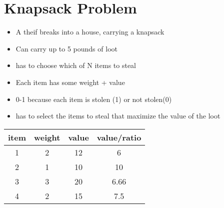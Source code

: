 \documentclass{article}
\begin{document}
\section*{Knapsack Problem}
\begin{itemize}
    \item A theif breaks into a house, carrying a knapsack
    \item Can carry up to 5 pounds of loot
    \item has to choose which of N items to steal
    \item Each item has some weight + value
    \item 0-1 because each item is stolen (1) or not stolen(0)
    \item has to select the items to steal that maximize the value of the loot
\end{itemize}

\begin{tabular}{c|c|c||c}
    item & weight & value & value/ratio \\
    \hline
    1    & 2      & 12    & 6           \\
    2    & 1      & 10    & 10          \\
    3    & 3      & 20    & 6.66        \\
    4    & 2      & 15    & 7.5         \\
\end{tabular}
\end{document}
